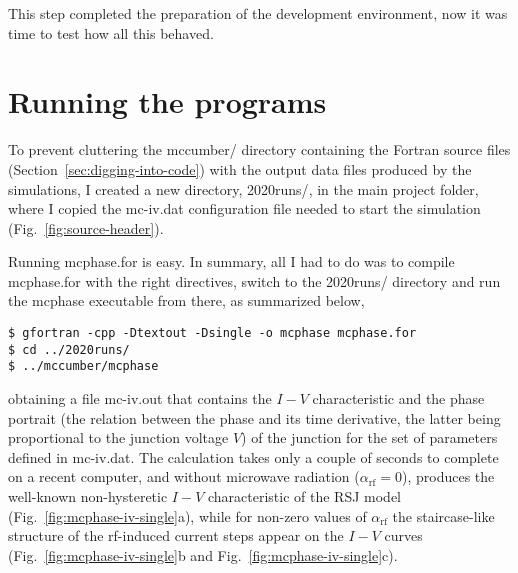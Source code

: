 This step completed the preparation of the development environment, now it was time to test how all this behaved.



\section{Running the programs}

To prevent cluttering the \textsf{mccumber/} directory containing the Fortran source files (Section~\ref{sec:digging-into-code}) with the output data files produced by the simulations, I created  a new directory, \textsf{2020runs/}, in the main project folder, where I copied the \textsf{mc-iv.dat} configuration file needed to start the simulation (Fig.~\ref{fig:source-header}).

Running \textsf{mcphase.for} is easy. In summary, all I had to do was to compile \textsf{mcphase.for} with the right directives, switch to the \textsf{2020runs/} directory and run the \textsf{mcphase} executable from there, as summarized below,

\begin{lstlisting}
$ gfortran -cpp -Dtextout -Dsingle -o mcphase mcphase.for
$ cd ../2020runs/
$ ../mccumber/mcphase
\end{lstlisting}

obtaining a file \textsf{mc-iv.out} that contains the $I - V$ characteristic and the phase portrait (the relation between the phase and its time derivative, the latter being proportional to the junction voltage $V$) of the junction for the set of parameters defined in \textsf{mc-iv.dat}. 
The calculation takes only a couple of seconds to complete on a recent computer, and without microwave radiation ($\alpha_\mathrm{rf} = 0$), produces the well-known non-hysteretic $I - V$ characteristic of the RSJ model (Fig.~\ref{fig:mcphase-iv-single}a), while for non-zero values of $\alpha_\mathrm{rf}$ the staircase-like structure of the rf-induced current steps appear on the $I - V$ curves (Fig.~\ref{fig:mcphase-iv-single}b and Fig.~\ref{fig:mcphase-iv-single}c).

